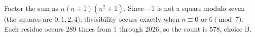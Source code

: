 Factor the sum as $n(n+1)(n^2+1)$. Since $-1$ is not a square modulo seven (the squares are $0,1,2,4$), divisibility occurs exactly when $n\equiv0$ or $6\pmod7$. Each residue occurs 289 times from 1 through 2026, so the count is $\boxed{578}$, choice B.
